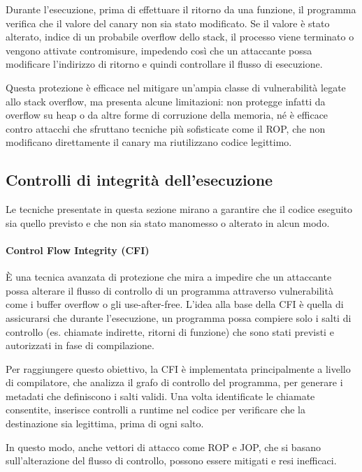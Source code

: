 Durante l'esecuzione, prima di effettuare il ritorno da una funzione, il
programma verifica che il valore del canary non sia stato modificato. Se il valore
è stato alterato, indice di un probabile overflow dello stack, il processo viene
terminato o vengono attivate contromisure, impedendo così che un attaccante
possa modificare l'indirizzo di ritorno e quindi controllare il flusso di
esecuzione.

Questa protezione è efficace nel mitigare un'ampia classe di vulnerabilità
legate allo stack overflow, ma presenta alcune limitazioni: non protegge infatti
da overflow su heap o da altre forme di corruzione della memoria, né è efficace contro
attacchi che sfruttano tecniche più sofisticate come il ROP, che non modificano
direttamente il canary ma riutilizzano codice legittimo.\cite{stack_canaries}

\subsection{Controlli di integrità dell'esecuzione}
\label{sec:execution-integrity} Le tecniche presentate in questa sezione mirano a
garantire che il codice eseguito sia quello previsto e che non sia stato manomesso
o alterato in alcun modo.

\paragraph{Control Flow Integrity (CFI)}
È una tecnica avanzata di protezione che mira a impedire che un attaccante possa
alterare il flusso di controllo di un programma attraverso vulnerabilità come i
buffer overflow o gli use-after-free. L'idea alla base della CFI è quella di assicurarsi
che durante l'esecuzione, un programma possa compiere solo i salti di controllo
(es. chiamate indirette, ritorni di funzione) che sono stati previsti e
autorizzati in fase di compilazione.

Per raggiungere questo obiettivo, la CFI è implementata principalmente a livello
di compilatore, che analizza il grafo di controllo del programma, per generare i
metadati che definiscono i salti validi. Una volta identificate le chiamate
consentite, inserisce controlli a runtime nel codice per verificare che la destinazione
sia legittima, prima di ogni salto.

In questo modo, anche vettori di attacco come ROP e JOP, che si basano sull'alterazione
del flusso di controllo, possono essere mitigati e resi inefficaci.

